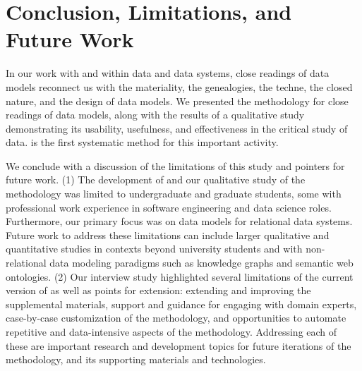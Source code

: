\section{Conclusion, Limitations, and Future Work}
\label{sec:conc}
In our work with and within data and data systems, close readings of data models reconnect us with the materiality, the genealogies, the techne, the closed nature, and the design of data models.  
We presented the \credal methodology for close readings of data models, along with the results of a qualitative study demonstrating its usability, usefulness, and effectiveness in the critical study of data.   \credal is the first systematic method for this important activity.

We conclude with a discussion of the limitations of this study and pointers for future work.   (1) The development of \credal and our qualitative study of the methodology was limited to undergraduate and graduate students, some with professional work experience in software engineering and data science roles.  Furthermore, our primary focus was on data models for relational data systems.  Future work to address these limitations can include larger qualitative and quantitative studies in contexts beyond university students and with non-relational data modeling paradigms such as knowledge graphs and semantic web ontologies. (2) Our interview study highlighted several limitations of the current version of \credal as well as points for extension: extending and improving the supplemental materials, support and guidance for engaging with domain experts, case-by-case customization of the methodology, and opportunities to automate repetitive and data-intensive aspects of the methodology.  Addressing each of these are important research and development topics for future iterations of the methodology, and its supporting materials and technologies.